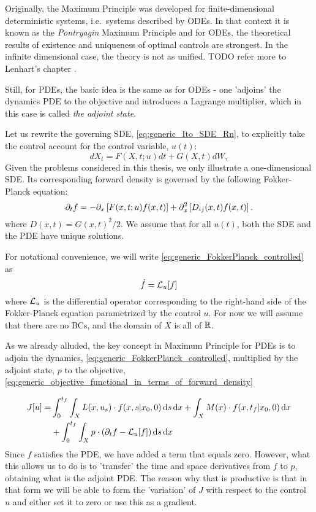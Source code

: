 Originally, the Maximum Principle was developed for finite-dimensional
deterministic systems, i.e.\ systems described by ODEs. In that context it is
known as the {\sl Pontryagin} Maximum Principle and for ODEs, the theoretical
results of existence and uniqueness of optimal controls are strongest. In the
infinite dimensional case, the theory is not as unified. TODO refer
more to Lenhart's chapter \cite{Lenhart2007}.

Still, for PDEs, the basic idea is the same as for ODEs - one 'adjoins' the
dynamics PDE to the objective and introduces a Lagrange multiplier, which in
this case is called {\sl the adjoint state}.

Let us rewrite the governing SDE, \cref{eq:generic_Ito_SDE_Rn}, to explicitly
take the control  account for the control variable, $u(t)$:
\begin{equation}
dX_t = F(X,t; u) dt + G(X,t) dW,
\label{eq:generic_Ito_SDE_Rn_controlled}
\end{equation} 
Given the problems considered in this thesis, we only
illustrate  a one-dimensional SDE. Its corresponding forward density is
governed by the following Fokker-Planck equation: 
\begin{equation}
{\partial}_t {f}= -{\partial}_{x } \left[ F (x,t;u) {f}(x,t) \right] +  
{\partial}^2_{x} \left[ D_{ij}(x,t) {f}(x,t) \right]
\label{eq:generic_FokkerPlanck_controlled}.
\end{equation} 
where $D(x,t) = G(x,t)^2/2$. We assume that for all $u(t)$, both the SDE and the
PDE have unique solutions. 

For notational convenience, we will write
\cref{eq:generic_FokkerPlanck_controlled} as
$$ \dot{{f}} = { \mathcal{L} }_{u} [{f}] $$ where ${ \mathcal{L} }_{u}$ is the differential operator corresponding to the
right-hand side of the Fokker-Planck equation parametrized by the control $u$.
For now we will assume that there are no BCs, and the domain of $X$ is all of ${ \mathbb{R} }$.

As we already alluded, the key concept in Maximum Principle for PDEs is to
adjoin the dynamics, \cref{eq:generic_FokkerPlanck_controlled}, multiplied by
the adjoint state, $p$ to the objective,
\cref{eq:generic_objective_functional_in_terms_of_forward_density}
  
\begin{align*}
J[u] =& \int_0^{ t_f }\int_X L(x, u_s) \cdot f(x,s|x_0,0) \, \mathrm{d} s\, \mathrm{d} x 
+ \int_X  M(x)\cdot f(x,{ t_f }|x_0,0)\, \mathrm{d} x
\\ &+ \int_0^{ t_f }\int_X p \cdot ({\partial}_t f - { \mathcal{L} }_{u} [{f}] ) \, \mathrm{d} s\, \mathrm{d} x 
\end{align*}
Since $f$ satisfies the PDE, we have added a term that equals zero. 
However, what this allows us to do is to 'transfer' the time and space
derivatives from $f$ to $p$, obtaining what is the adjoint PDE. The reason why
that is productive is that in that form we will be able to form the 'variation'
of $J$ with respect to the control $u$ and either set it to zero or use this as
a gradient. 

